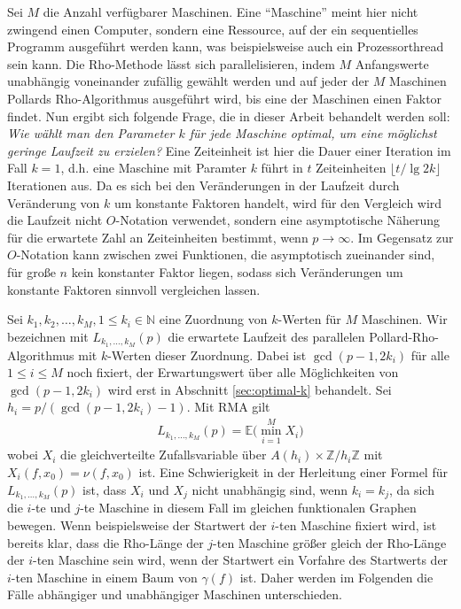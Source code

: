 \documentclass[a4paper, 10pt, ngerman]{article}
\newcommand{\E}{\mathbb{E}}
\newcommand{\N}{\mathbb{N}}
\newcommand{\Z}{\mathbb{Z}}
\begin{document}
Sei $M$ die Anzahl verfügbarer Maschinen. Eine "`Maschine"'  meint hier nicht zwingend einen Computer, sondern eine Ressource, auf der ein sequentielles Programm ausgeführt werden kann, was beispielsweise auch ein Prozessorthread sein kann. Die Rho-Methode lässt sich parallelisieren, indem $M$ Anfangswerte unabhängig voneinander zufällig gewählt werden und auf jeder der $M$ Maschinen Pollards Rho-Algorithmus ausgeführt wird, bis eine der Maschinen einen Faktor findet. Nun ergibt sich folgende Frage, die in dieser Arbeit behandelt werden soll: \emph{Wie wählt man den Parameter $k$ für jede Maschine optimal, um eine möglichst geringe Laufzeit zu erzielen?} Eine Zeiteinheit ist hier die Dauer einer Iteration im Fall $k = 1$, d.h. eine Maschine mit Paramter $k$ führt in $t$ Zeiteinheiten $\lfloor t / \lg 2k \rfloor$ Iterationen aus. Da es sich bei den Veränderungen in der Laufzeit durch Veränderung von $k$ um konstante Faktoren handelt, wird für den Vergleich wird die Laufzeit nicht $O$-Notation verwendet, sondern eine asymptotische Näherung für die erwartete Zahl an Zeiteinheiten bestimmt, wenn $p \to \infty$. Im Gegensatz zur $O$-Notation kann zwischen zwei Funktionen, die asymptotisch zueinander sind, für große $n$ kein konstanter Faktor liegen, sodass sich Veränderungen um konstante Faktoren sinnvoll vergleichen lassen.

Sei $k_1, k_2, \dots, k_M, 1 \le k_i \in \N$ eine Zuordnung von $k$-Werten für $M$ Maschinen.  Wir bezeichnen mit $L_{k_1, \dots, k_M}(p)$ die erwartete Laufzeit des parallelen Pollard-Rho-Algorithmus mit $k$-Werten dieser Zuordnung. Dabei ist $\gcd(p - 1, 2k_i)$ für alle $1 \le i \le M$ noch fixiert, der Erwartungswert über alle Möglichkeiten von $\gcd(p - 1, 2k_i)$ wird erst in Abschnitt \ref{sec:optimal-k} behandelt. Sei $h_i = p/(\gcd(p - 1, 2k_i) - 1)$. Mit RMA gilt
\begin{align}
    L_{k_1, \dots, k_M}(p) = \E \bigg ( \min_{i = 1}^M X_i \bigg ) \label{lk-definition}
\end{align}
wobei $X_i$ die gleichverteilte Zufallsvariable über $A(h_i) \times \Z/h_i\Z$ mit $X_i(f, x_0) = \nu(f, x_0)$ ist. Eine Schwierigkeit in der Herleitung einer Formel für $L_{k_1, \dots, k_M}(p)$ ist, dass $X_i$ und $X_j$ nicht unabhängig sind, wenn $k_i = k_j$, da sich die $i$-te und $j$-te Maschine in diesem Fall im gleichen funktionalen Graphen bewegen. Wenn beispielsweise der Startwert der $i$-ten Maschine fixiert wird, ist bereits klar, dass die Rho-Länge der $j$-ten Maschine größer gleich der Rho-Länge der $i$-ten Maschine sein wird, wenn der Startwert ein Vorfahre des Startwerts der $i$-ten Maschine in einem Baum von $\gamma(f)$ ist. Daher werden im Folgenden die Fälle abhängiger und unabhängiger Maschinen unterschieden.
\end{document}
